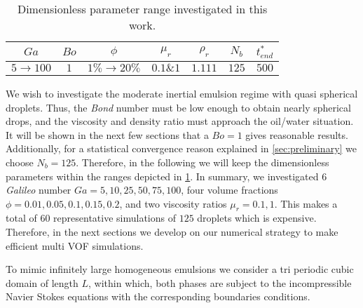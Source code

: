 \begin{table}[h!]
    \centering
    \caption{Dimensionless parameter range investigated in this work.}
    \begin{tabular}{ccccccc}\hline
        $Ga$&$Bo$&$\phi$&$\mu_r$&$\rho_r$&$N_b$&$t^*_{end}$\\ \hline\hline
        $5\rightarrow 100$&$1$&$1\% \rightarrow 20\%$&$0.1 \& 1$&$1.111$&$125$&$500$\\ \hline
    \end{tabular}
    \label{tab:parameters}
\end{table}

We wish to investigate the moderate inertial emulsion regime with quasi spherical droplets. 
Thus, the \textit{Bond} number must be low enough to obtain nearly spherical drops, and the viscosity and density ratio must approach the oil/water situation. 
It will be shown in the next few sections that a $Bo =1$ gives reasonable results. 
Additionally, for a statistical convergence reason explained in \ref{sec:preliminary} we choose $N_b = 125$. 
Therefore, in the following we will keep the dimensionless parameters within the ranges depicted in \ref{tab:parameters}.
In summary, we investigated $6$ \textit{Galileo} number $Ga = 5,10,25,50,75,100$, four volume fractions $\phi = 0.01,0.05,0.1,0.15,0.2$, and two viscosity ratios $\mu_r =0.1,1$. 
This makes a total of $60$ representative simulations of $125$ droplets which is expensive. 
Therefore, in the next sections we develop on our numerical strategy to make efficient multi VOF simulations. 


To mimic infinitely large homogeneous emulsions we consider a tri periodic cubic domain of length $L$, within which, both phases are subject to the incompressible Navier Stokes equations with the corresponding boundaries conditions. 


